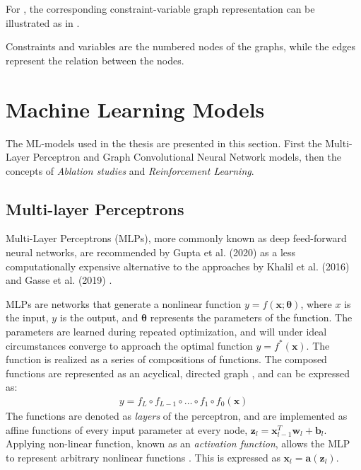 For , the corresponding constraint-variable graph representation can be illustrated as in
.

Constraints and variables are the numbered nodes of the graphs, while the edges represent the relation between the nodes. 



\section{Machine Learning Models}\label{sec:back_models}


The \gls{ML}-models used in the thesis are presented in this section. First the Multi-Layer Perceptron and Graph Convolutional Neural Network models, then the concepts of \textit{Ablation studies} and \textit{Reinforcement Learning}.

\subsection{Multi-layer Perceptrons}\label{ssec:back_mlp}

Multi-Layer Perceptrons (\gls{MLP}s), more commonly known as deep feed-forward neural networks, are recommended by Gupta et al. (2020) \cite{gupta2020hybrid} as a less computationally expensive alternative to the approaches by Khalil et al. (2016) \cite{khalil2016learning} and Gasse et al. (2019) \cite{gasse2019exact}. 

\gls{MLP}s are networks that generate a nonlinear function $y = f(\mathbf{x}; \bm{\theta})$, where $x$ is the input, $y$ is the output, and $\bm{\theta}$ represents the parameters of the function. The parameters are learned during repeated optimization, and will under ideal circumstances converge to approach the optimal function $y = f^*(\mathbf{x})$. The function is realized as a series of compositions of functions. The composed functions are represented as an acyclical, directed graph \cite{nielsen2018neural}, and can be expressed as:
\begin{align}
    y = f_L \circ f_{L-1} \circ \ldots \circ f_{1} \circ f_{0} (\mathbf{x})  
\end{align}
The functions are denoted as \textit{layers} of the perceptron, and are implemented as affine functions of every input parameter at every node, $\mathbf{z}_l = \mathbf{x}_{l-1}^T \mathbf{w}_l + \mathbf{b}_l$. Applying non-linear function, known as an \textit{activation function}, allows the \gls{MLP} to represent arbitrary nonlinear functions \cite{goodfellow2016deep}. This is expressed as $\mathbf{x}_l = \mathbf{a}(\mathbf{z}_l)$.

